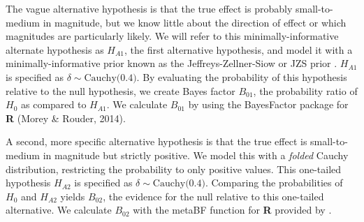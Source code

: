 \documentclass[man]{apa6}
\begin{document}
The vague alternative hypothesis is that the true effect is probably small-to-medium in magnitude, but we know little about the direction of effect or which magnitudes are particularly likely. We will refer to this minimally-informative alternate hypothesis as $H_{A1}$, the first alternative hypothesis, and model it with a minimally-informative prior known as the Jeffreys-Zellner-Siow or JZS prior \citep[see ][]{Jeffreys:1961,Liang:etal:2008,Rouder:etal:2009a,Zellner:Siow:1980}. %
$H_{A1}$ is specified as $\delta \sim \mbox{Cauchy(0.4)}$. By evaluating the probability of this hypothesis relative to the null hypothesis, we create Bayes factor $B_{01}$, the probability ratio of $H_0$ as compared to $H_{A1}$. We calculate $B_{01}$ by using the BayesFactor package for \textbf{R} (Morey \& Rouder, 2014).  

A second, more specific alternative hypothesis is that the true effect is small-to-medium in magnitude but strictly positive. We model this with a {\em folded} Cauchy distribution, restricting the probability to only positive values. This one-tailed hypothesis $H_{A2}$ is specified as $\delta \sim \mbox{Cauchy(0.4)}$. Comparing the probabilities of $H_0$ and $H_{A2}$ yields $B_{02}$, the evidence for the null relative to this one-tailed alternative. We calculate $B_{02}$ with the metaBF function for \textbf{R} provided by \citet{Rouder:Morey:2011}.
\end{document}
